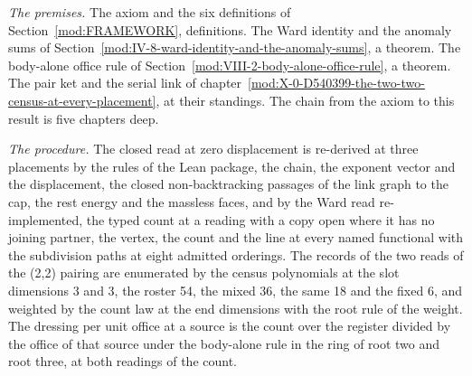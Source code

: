 \begin{chproof}
\textit{The premises.} The axiom and the six definitions of Section~\ref{mod:FRAMEWORK}, definitions. The Ward identity and the anomaly sums of Section~\ref{mod:IV-8-ward-identity-and-the-anomaly-sums}, a theorem. The body-alone office rule of Section~\ref{mod:VIII-2-body-alone-office-rule}, a theorem. The pair ket and the serial link of chapter~\ref{mod:X-0-D540399-the-two-two-census-at-every-placement}, at their standings. The chain from the axiom to this result is five chapters deep.

\textit{The procedure.} The closed read at zero displacement is re-derived at three placements by the rules of the Lean package, the chain, the exponent vector and the displacement, the closed non-backtracking passages of the link graph to the cap, the rest energy and the massless faces, and by the Ward read re-implemented, the typed count at a reading with a copy open where it has no joining partner, the vertex, the count and the line at every named functional with the subdivision paths at eight admitted orderings. The records of the two reads of the (2,2) pairing are enumerated by the census polynomials at the slot dimensions 3 and 3, the roster 54, the mixed 36, the same 18 and the fixed 6, and weighted by the count law at the end dimensions with the root rule of the weight. The dressing per unit office at a source is the count over the register divided by the office of that source under the body-alone rule in the ring of root two and root three, at both readings of the count.


\end{chproof}
